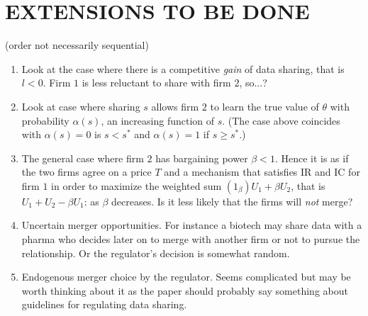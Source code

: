 \documentclass[a4paper]{article}
\renewcommand{\t}{\theta}
\begin{document}
\section{EXTENSIONS TO BE DONE}  
(order not necessarily sequential)
    \begin{enumerate}[TBD 1.]\setlength\itemsep{0em}
      \item Look at the case where there is a competitive \emph{gain} of data sharing, that is $l<0$. Firm $1$ is less reluctant to share with firm $2$, so...?
      \item Look at case where sharing $s$ allows firm $2$ to learn the true value of $\t$ with probability $\alpha(s)$, an increasing function of $s$. (The case above coincides with $\alpha(s)=0$ is $s<s^*$ and $\alpha(s)=1$ if $s\geq s^*$.)
      \item The general case where firm $2$ has bargaining power $\beta<1$. Hence it is as if the two firms agree on a price $T$ and a mechanism that satisfies IR and IC for firm $1$ in order to maximize the weighted sum $(1_\beta)U_1+\beta U_2$, that is $U_1+U_2-\beta U_1$: as $\beta$ decreases. Is it less likely that the firms will \emph{not} merge?
      \item Uncertain merger opportunities. For instance a biotech may share data with a pharma who decides later on to merge with another firm or not to pursue the relationship. Or the regulator's decision is somewhat random.
      \item Endogenous merger choice by the regulator. Seems complicated but may be worth thinking about it as the paper should probably say something about guidelines for regulating data sharing.
    \end{enumerate}



\end{document}

